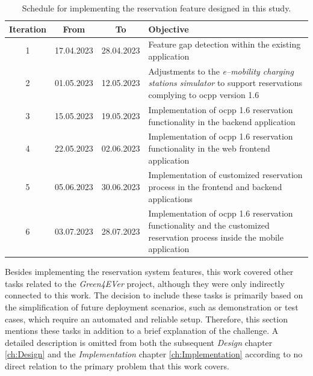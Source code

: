 \begingroup
\setlength{\tabcolsep}{10pt} %
\renewcommand{\arraystretch}{1.5} %
\begin{table}[h]
    \centering
    \caption{Schedule for implementing the reservation feature designed in this study.}
    \begin{tabular}{c|c|c|m{7cm}}
        Iteration & From & To & Objective \\
        \hline
        1 & 17.04.2023 & 28.04.2023 & Feature gap detection within the existing application \\
        2 & 01.05.2023 & 12.05.2023 & Adjustments to the \textit{e--mobility charging stations simulator} \cite{noauthor_github_nodate-3} to support reservations complying to \acrshort{ocpp} version 1.6 \\
        3 & 15.05.2023 & 19.05.2023 & Implementation of \acrshort{ocpp} 1.6 reservation functionality in the backend application \\
        4 & 22.05.2023 & 02.06.2023 & Implementation of \acrshort{ocpp} 1.6 reservation functionality in the web frontend application \\
        5 & 05.06.2023 & 30.06.2023 & Implementation of customized reservation process in the frontend and backend applications \\
        6 & 03.07.2023 & 28.07.2023 & Implementation of \acrshort{ocpp} 1.6 reservation functionality and the customized reservation process inside the mobile application \\
    \end{tabular}
    \label{tab:development-iterations}
\end{table}
\endgroup

\noindent Besides implementing the reservation system features, this work covered other tasks related to the \textit{Green4EVer} \cite{noauthor_hka_nodate} project, although they were only indirectly connected to this work.
The decision to include these tasks is primarily based on the simplification of future deployment scenarios, such as demonstration or test cases, which require an automated and reliable setup.
Therefore, this section mentions these tasks in addition to a brief explanation of the challenge. A detailed description is omitted from both the subsequent \textit{Design} chapter \ref{ch:Design} and the \textit{Implementation} chapter \ref{ch:Implementation} according to no direct relation to the primary problem that this work covers.

